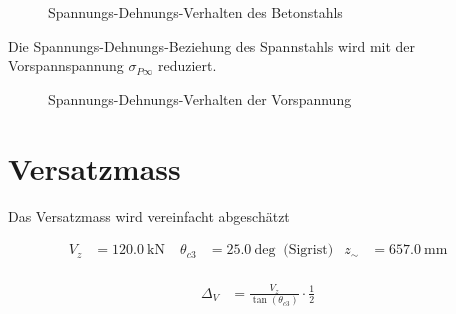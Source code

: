 \documentclass[
  11pt,
  letterpaper,
]{scrreprt}
\begin{document}
\begin{figure}[H]


\caption{\label{fig-sigma_eps_t6}Spannungs-Dehnungs-Verhalten des
Betonstahls}

\end{figure}%

Die Spannungs-Dehnungs-Beziehung des Spannstahls wird mit der
Vorspannspannung \(\sigma_{P\infty}\) reduziert.

\begin{figure}[H]


\caption{\label{fig-sigma_eps_vorspannung_t6}Spannungs-Dehnungs-Verhalten
der Vorspannung}

\end{figure}%

\section{Versatzmass}\label{versatzmass-1}

Das Versatzmass wird vereinfacht abgeschätzt

$$
\begin{aligned}
V_{z} &= 120.0\ \mathrm{kN} \; 
 &\theta_{c3} &= 25.0\ \mathrm{deg} \; \;\textrm{(Sigrist)}
 &z_{\sim} &= 657.0\ \mathrm{mm} \; 
\\[10pt]
\end{aligned}
$$

$$
\begin{aligned}
\Delta_{V} &= \frac{ V_{z} }{ \tan \left( \theta_{c3} \right) } \cdot \frac{1} { 2 } \; 
\end{aligned}
$$
\end{document}
